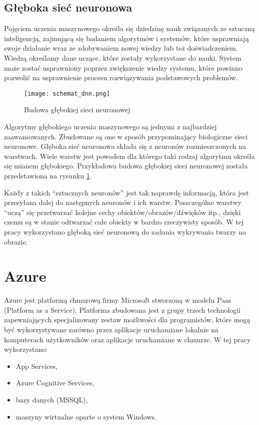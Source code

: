 \subsection{Głęboka sieć neuronowa} \label{dnn}
Pojęciem uczenia maszynowego \cite{dnn} określa się dziedzinę nauk związanych ze sztuczną inteligencją, zajmującą się badaniem algorytmów i systemów, które usprawniają swoje działanie wraz ze zdobywaniem nowej wiedzy lub też doświadczeniem. Wiedzą określamy dane uczące, które zostały wykorzystane do nauki. System może zostać usprawniony poprzez zwiększenie wiedzy systemu, które powinno pozwolić na usprawnienie procesu rozwiązywania podstawowych problemów.
\begin{figure}[H]
	\centering
	\texttt{[image: schemat\_dnn.png]}
	\caption{Budowa głębokiej sieci neuronowej \cite{dnn}}
	\label{fig:budowa_dnn}
\end{figure}
Algorytmy głębokiego uczenia maszynowego są jednymi z najbardziej zaawansowanych. Zbudowane są one w sposób przypominający biologiczne sieci neuronowe. Głęboka sieć neuronowa składa się z neuronów rozmieszczonych na warstwach. Wiele warstw jest powodem dla którego taki rodzaj algorytmu określa się mianem głębokiego. Przykładowa budowa głębokiej sieci neuronowej została przedstawiona na rysunku \ref{fig:budowa_dnn}.

Każdy z takich “sztucznych neuronów” jest tak naprawdę informacją, która jest przesyłana dalej do następnych neuronów i ich warstw. Poszczególne warstwy “uczą” się przetwarzać kolejne cechy obiektów/obrazów/dźwięków itp., dzięki czemu są w stanie odtwarzać całe obiekty w bardzo rzeczywisty sposób. W tej pracy wykorzystano głęboką sieć neuronową do zadania wykrywania twarzy na obrazie.

\section{Azure} \label{azure}
Azure jest platformą chmurową firmy Microsoft stworzoną w modelu Paas (Platform as a Service). Platforma zbudowana jest z grupy trzech technologii zapewniających specjalizowany zestaw możliwości dla programistów, które mogą być wykorzystywane zarówno przez aplikacje uruchamiane lokalnie na komputerach użytkowników oraz aplikacje uruchamiane w chmurze. W tej pracy wykorzystano:
\begin{itemize}
    \item App Services,
    \item Azure Cognitive Services,
    \item bazy danych (MSSQL),
    \item maszyny wirtualne oparte o system Windows.
\end{itemize}
